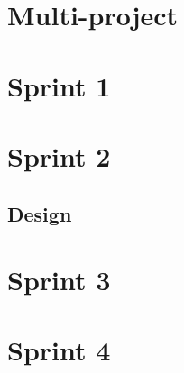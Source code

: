 \chapter{Multi-project}



\chapter{Sprint 1}

\newpage




















\chapter{Sprint 2}


\newpage




\section{Design}











\chapter{Sprint 3}





\chapter{Sprint 4}



